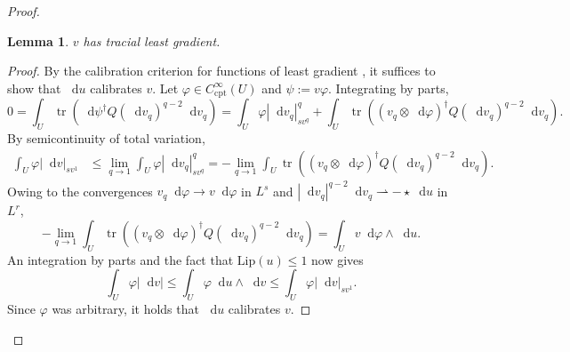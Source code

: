 \documentclass[reqno,11pt]{amsart}
\newcommand*\dif{\mathop{}\!\mathrm{d}}
\DeclareMathOperator{\tr}{tr}
\newcommand{\Lip}{\mathrm{Lip}}
\newcommand{\cpt}{\mathrm{cpt}}
\newtheorem{lemma}[theorem]{Lemma}
\newcommand{\weakto}{\rightharpoonup}
\theoremstyle{definition}
\numberwithin{equation}{section}
\begin{document}
\begin{proof}


\begin{lemma}
$v$ has tracial least gradient.
\end{lemma}
\begin{proof}
By the calibration criterion for functions of least gradient \cite[Theorem 1.1]{Mazon14}, it suffices to show that $\dif u$ calibrates $v$.
Let $\varphi \in C^\infty_\cpt(U)$ and $\psi := v\varphi$.
Integrating by parts,
$$0 = \int_U \tr(\dif \psi^\dagger Q(\dif v_q)^{q - 2} \dif v_q) = \int_U \varphi |\dif v_q|_{sv^q}^q + \int_U \tr((v_q \otimes \dif \varphi)^\dagger Q(\dif v_q)^{q - 2} \dif v_q).$$
By semicontinuity of total variation,
\begin{align*}
\int_U \varphi |\dif v|_{sv^1}
&\leq \lim_{q \to 1} \int_U \varphi |\dif v_q|_{sv^q}^q 
= -\lim_{q \to 1} \int_U \tr((v_q \otimes \dif \varphi)^\dagger Q(\dif v_q)^{q - 2} \dif v_q).
\end{align*}
Owing to the convergences $v_q \dif \varphi \to v \dif \varphi$ in $L^s$ and $|\dif v_q|^{q - 2} \dif v_q \weakto -\star \dif u$ in $L^r$,
$$
-\lim_{q \to 1} \int_U \tr((v_q \otimes \dif \varphi)^\dagger Q(\dif v_q)^{q - 2} \dif v_q) = \int_U v\dif \varphi \wedge \dif u.
$$
An integration by parts and the fact that $\Lip(u) \leq 1$ now gives
$$\int_U \varphi |\dif v| \leq \int_U \varphi \dif u \wedge \dif v \leq \int_U \varphi |\dif v|_{sv^1}.$$
Since $\varphi$ was arbitrary, it holds that $\dif u$ calibrates $v$.
\end{proof}


\end{proof}
\end{document}
